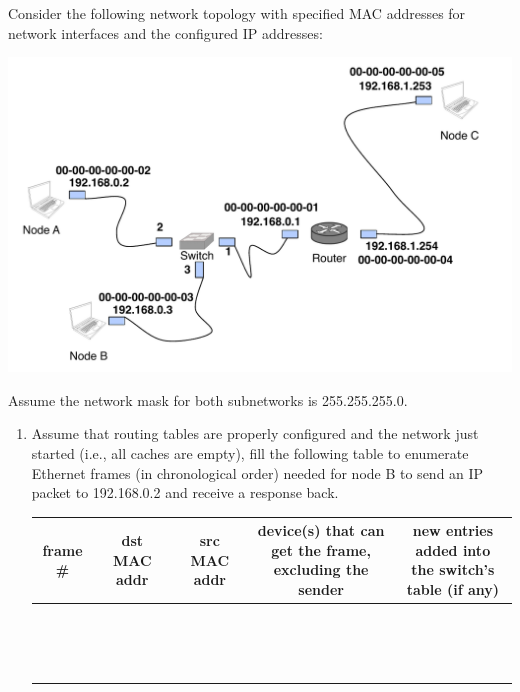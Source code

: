 \documentclass{report}
\begin{document}
\begin{problem}
Consider the following network topology with specified MAC addresses for network interfaces and the configured IP addresses:

\begin{center}
  \includegraphics[scale=0.7]{hw8-q5.pdf}
\end{center}

Assume the network mask for both subnetworks is 255.255.255.0.
\begin{enumerate}

  \item Assume that routing tables are properly configured and the network just started (i.e., all caches are empty), fill the following table to enumerate Ethernet frames (in chronological order) needed for node B to send an IP packet to 192.168.0.2 and receive a response back.

  \begin{table}[H]
    \centering
    \begin{tabular*}{1.0\textwidth}{c | c | c | c | c}
      \hline
      frame \# &  dst MAC addr & src MAC addr & \pbox{20cm}{device(s) that can get the frame, \\excluding the sender} & \pbox{20cm}{new entries added into \\the switch's table (if any)} \\ \hline

        &  &  & &\\ 
        &  &  & &\\ 
        &  &  & &\\ 
        &  &  & &\\ 
        &  &  & &\\ 
        &  &  & &\\ 
        &  &  & &\\ 
        &  &  & &\\ 
        &  &  & &\\ 
        &  &  & &\\ 
        &  &  & &\\ 
        &  &  & &\\ 
        &  &  & &\\ 
        &  &  & &\\ 
        &  &  & &\\ 
    \end{tabular*}
  \end{table}


\end{enumerate}
\end{problem}
\end{document}
